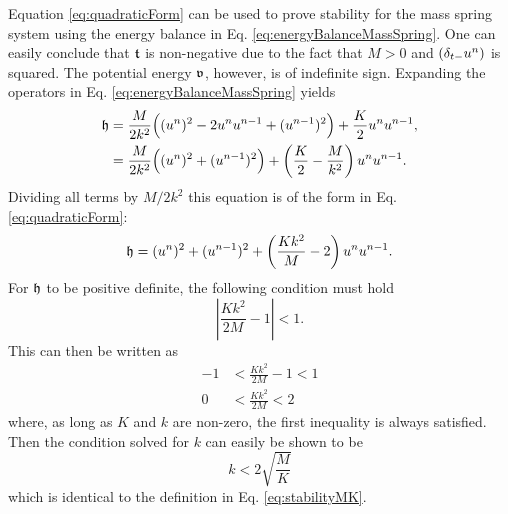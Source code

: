 {{Equation \eqref{eq:quadraticForm} can be used to prove stability for the mass spring system using the energy balance in Eq. \eqref{eq:energyBalanceMassSpring}. One can easily conclude that $\mathfrak{t}$ is non-negative due to the fact that  $M > 0$ and $(\delta_{t-} u^n)$ is squared. The potential energy $\mathfrak{v}$, however, is of indefinite sign. Expanding the operators in Eq. \eqref{eq:energyBalanceMassSpring} yields
\begin{align*}
    \mathfrak{h} &= \frac{M}{2k^2}\Big((u^n)^2 - 2u^n u^{n-1} + (u^{n-1})^2\Big)+ \frac{K}{2}u^n u^{n-1},\\
    &= \frac{M}{2k^2}\Big((u^n)^2+ (u^{n-1})^2\Big)+ \left(\frac{K}{2}-\frac{M}{k^2}\right)u^n u^{n-1}.
\end{align*}
Dividing all terms by $M/2k^2$ this equation is of the form in Eq. \eqref{eq:quadraticForm}:
\begin{equation*}
    \mathfrak{h} = (u^n)^2+ (u^{n-1})^2+ \left(\frac{Kk^2}{M} - 2\right)u^n u^{n-1}.
\end{equation*}
For $\mathfrak{h}$ to be positive definite, the following condition must hold
\begin{equation*}
    \left|\frac{Kk^2}{2M} - 1\right| < 1.
\end{equation*}
This can then be written as
\begin{align*}
    -1&<\frac{Kk^2}{2M} - 1<1\\
    0 &< \frac{Kk^2}{2M} < 2
\end{align*}
where, as long as $K$ and $k$ are non-zero, the first inequality is always satisfied. Then the condition solved for $k$ can easily be shown to be
\begin{equation}
    k < 2\sqrt{\frac{M}{K}}
\end{equation}
which is identical to the definition in Eq. \eqref{eq:stabilityMK}.

}}
